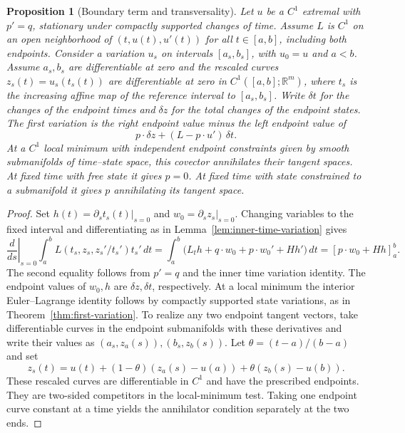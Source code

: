 \documentclass[11pt,oneside,openany]{book}
\theoremstyle{plain}
\newtheorem{proposition}[theorem]{Proposition}
\theoremstyle{definition}
\theoremstyle{remark}
\begin{document}
\begin{proposition}[Boundary term and transversality]
\label{prop:variation-boundary}
Let \(u\) be a \(C^1\) extremal with \(p'=q\), stationary under
compactly supported changes of time. Assume \(L\) is \(C^1\) on an
open neighborhood of \((t,u(t),u'(t))\) for all \(t\in[a,b]\),
including both endpoints. Consider a variation
\(u_s\) on intervals \([a_s,b_s]\), with \(u_0=u\) and \(a<b\).
Assume \(a_s,b_s\) are differentiable at zero and the rescaled
curves \(z_s(t)=u_s(t_s(t))\) are differentiable at zero in
\(C^1([a,b];\mathbb R^m)\), where \(t_s\) is the increasing
affine map of the reference interval to \([a_s,b_s]\).
Write \(\delta t\) for the changes of the endpoint times
and \(\delta z\) for the total changes of the endpoint states.
The first variation is the right endpoint value minus the
left endpoint value of
\[
 p\cdot\delta z+(L-p\cdot u')\,\delta t.
\]
At a \(C^1\) local minimum with independent endpoint constraints
given by smooth submanifolds of time--state space, this covector
annihilates their tangent spaces. At fixed time with free state
it gives \(p=0\). At fixed time with state constrained to a
submanifold it gives \(p\) annihilating its tangent space.
\end{proposition}
\begin{proof}
Set \(h(t)=\partial_s t_s(t)|_{s=0}\) and
\(w_0=\partial_s z_s|_{s=0}\).
Changing variables to the fixed interval and differentiating
as in Lemma~\ref{lem:inner-time-variation} gives
\[
 \left.\frac{d}{ds}\right|_{s=0}\!
   \int_a^b L(t_s,z_s,z_s'/t_s')t_s'\,dt
 =\int_a^b \bigl(L_t h+q\cdot w_0+p\cdot w_0'+Hh'\bigr)\,dt
 =[p\cdot w_0+Hh]_a^b.
\]
The second equality follows from \(p'=q\) and the inner time
variation identity. The endpoint values of \(w_0,h\) are
\(\delta z,\delta t\), respectively. At a local minimum the
interior Euler--Lagrange identity follows by compactly supported
state variations, as in Theorem~\ref{thm:first-variation}.
To realize any two endpoint tangent vectors, take differentiable
curves in the endpoint submanifolds with these derivatives and
write their values as \((a_s,z_a(s)),(b_s,z_b(s))\).
Let \(\theta=(t-a)/(b-a)\) and set
\[
 z_s(t)=u(t)+(1-\theta)(z_a(s)-u(a))
                         +\theta(z_b(s)-u(b)).
\]
These rescaled curves are differentiable in \(C^1\) and have the
prescribed endpoints. They are two-sided competitors in the
local-minimum test. Taking one endpoint curve constant at a time
yields the annihilator condition separately at the two ends.
\end{proof}
\end{document}

